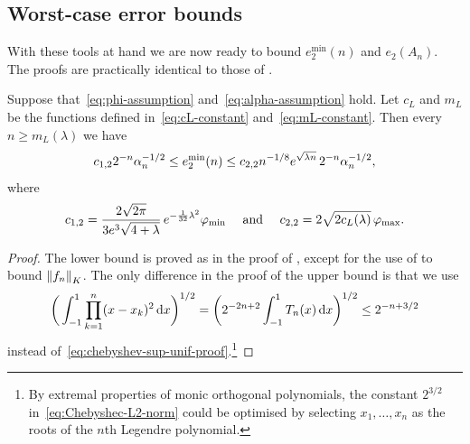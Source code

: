 \documentclass{mcom-l}
\numberwithin{equation}{section}
\numberwithin{theorem}{section} %
\begin{document}
 
\subsection{Worst-case error bounds}

With these tools at hand we are now ready to bound $e_2^{\min}(n)$ and $e_2(A_n)$.
The proofs are practically identical to those of .

\begin{theorem} \label{thm:e-min-L2}
  Suppose that~\eqref{eq:phi-assumption} and~\eqref{eq:alpha-assumption} hold.
  Let $c_L$ and $m_L$ be the functions defined in~\eqref{eq:cL-constant} and~\eqref{eq:mL-constant}.
  Then every $n \geq m_L(\lambda)$ we have
  \begin{equation*}
    c_{1,2} 2^{-n} \alpha_n^{-1/2} \leq e_2^{\min}(n) \leq c_{2,2} n^{-1/8} e^{\sqrt{\smash[b]{\lambda n}}} \, 2^{-n} \alpha_n^{-1/2},
  \end{equation*}
  where
  \begin{equation} \label{eq:l2-constants}
    c_{1,2} = \frac{2\sqrt{2\pi}}{3e^3 \sqrt{\smash[b]{4 + \lambda}}} \, e^{-\frac{1}{32} \lambda^2 } \varphi_\textup{min} \quad \text{ and } \quad c_{2,2} = 2\sqrt{2 c_L(\lambda)} \, \varphi_{\max}.
  \end{equation}
\end{theorem}
\begin{proof}
  The lower bound is proved as in the proof of , except for the use of  to bound $\norm[0]{f_n}_K$.
  The only difference in the proof of the upper bound is that we use
  \begin{equation} \label{eq:Chebyshec-L2-norm}
    \bigg( \int_{-1}^1 \prod_{k=1}^n (x - x_k)^2 \dif x \bigg)^{1/2} = \bigg( 2^{-2n+2} \int_{-1}^1 T_n(x) \dif x \bigg)^{1/2} \leq 2^{-n + 3/2}
  \end{equation}
  instead of~\eqref{eq:chebyshev-sup-unif-proof}.\footnote{By extremal properties of monic orthogonal polynomials, the constant $2^{3/2}$ in~\eqref{eq:Chebyshec-L2-norm} could be optimised by selecting $x_1, \ldots, x_n$ as the roots of the $n$th Legendre polynomial.}
\end{proof}
\end{document}
